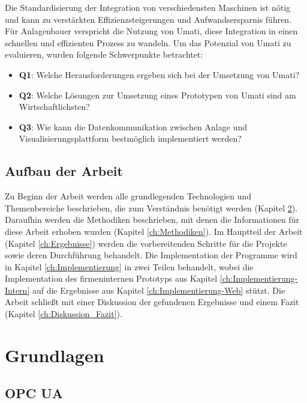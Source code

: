 \documentclass[a4paper, 12pt, oneside, toc=listofnumbered, bibliography=totoc]{scrbook}
\begin{document}
	Die Standardisierung der Integration von verschiedensten Maschinen ist nötig und kann zu verstärkten Effizienzsteigerungen und Aufwandsersparnis führen. Für Anlagenbauer verspricht die Nutzung von \ac{Umati}, diese Integration in einen schnellen und effizienten Prozess zu wandeln. Um das Potenzial von \ac{Umati} zu evaluieren, wurden folgende Schwerpunkte betrachtet:
	
	\begin{itemize}
		\item \textbf{Q1}: Welche Herausforderungen ergeben sich bei der Umsetzung von \ac{Umati}?
		\item \textbf{Q2}: Welche Lösungen zur Umsetzung eines Prototypen von \ac{Umati} sind am Wirtschaftlichsten?
		\item \textbf{Q3}: Wie kann die Datenkommunikation zwischen Anlage und Visualisierungsplattform bestmöglich implementiert werden?
	\end{itemize}
	
	\section{Aufbau der Arbeit}
	
	Zu Beginn der Arbeit werden alle grundlegenden Technologien und Themenbereiche beschrieben, die zum Verständnis benötigt werden (Kapitel \ref{ch:Grundlagen}). Daraufhin werden die Methodiken beschrieben, mit denen die Informationen für diese Arbeit erhoben wurden (Kapitel \ref{ch:Methodiken}). Im Hauptteil der Arbeit (Kapitel \ref{ch:Ergebnisse}) werden die vorbereitenden Schritte für die Projekte sowie deren Durchführung behandelt. Die Implementation der Programme wird in Kapitel \ref{ch:Implementierung} in zwei Teilen behandelt, wobei die Implementation des firmeninternen Prototyps aus Kapitel \ref{ch:Implementierung-Intern} auf die Ergebnisse aus Kapitel \ref{ch:Implementierung-Web} stützt. Die Arbeit schließt mit einer Diskussion der gefundenen Ergebnisse und einem Fazit (Kapitel \ref{ch:Diskussion_Fazit}).
	
	
\chapter{Grundlagen}\label{ch:Grundlagen}
	
	\section{OPC UA}
	
\end{document}
